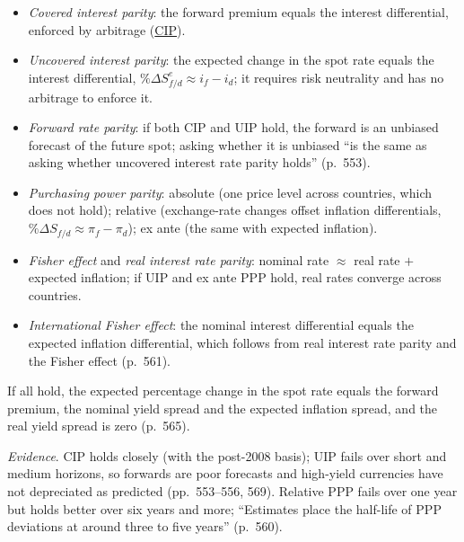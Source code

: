 \begin{qfresult}\label{res:international-parity-conditions}
 \citep[chap.~10, sec.~3.1, pp.~549--565]{economics-investment-decision-makers-2013}
\begin{itemize}
\item \emph{Covered interest parity}: the forward premium equals the interest differential, enforced by arbitrage (\hyperref[meth:cross-forward-rates]{CIP}).
\item \emph{Uncovered interest parity}: the expected change in the spot rate equals the interest differential, $\%\Delta S^e_{f/d}\approx i_f-i_d$; it requires risk neutrality and has no arbitrage to enforce it.
\item \emph{Forward rate parity}: if both CIP and UIP hold, the forward is an unbiased forecast of the future spot; asking whether it is unbiased ``is the same as asking whether uncovered interest rate parity holds'' (p.~553).
\item \emph{Purchasing power parity}: absolute (one price level across countries, which does not hold); relative (exchange-rate changes offset inflation differentials, $\%\Delta S_{f/d}\approx\pi_f-\pi_d$); ex ante (the same with expected inflation).
\item \emph{Fisher effect} and \emph{real interest rate parity}: nominal rate $\approx$ real rate $+$ expected inflation; if UIP and ex ante PPP hold, real rates converge across countries.
\item \emph{International Fisher effect}: the nominal interest differential equals the expected inflation differential, which follows from real interest rate parity and the Fisher effect (p.~561).
\end{itemize}
If all hold, the expected percentage change in the spot rate equals the forward premium, the nominal yield spread and the expected inflation spread, and the real yield spread is zero (p.~565).

\emph{Evidence}. CIP holds closely (with the post-2008 basis); UIP fails over short and medium horizons, so forwards are poor forecasts and high-yield currencies have not depreciated as predicted (pp.~553--556, 569). Relative PPP fails over one year but holds better over six years and more; ``Estimates place the half-life of PPP deviations at around three to five years'' (p.~560).


\end{qfresult}
